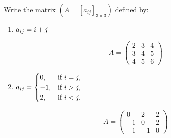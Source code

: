 \item  Write the matrix $\left(A=\left[a_{ij}\right]_{3\times3}\right)$ defined by:
    \begin {enumerate}
        \item $\mathlarger{a}_{ij} = i + j$
        \begin{answer}
            $$
            A = \begin{pmatrix}
            2 & 3 & 4 \\
            3 & 4 & 5 \\
            4 & 5 & 6
            \end{pmatrix}
            $$
        \end{answer}
        \item $\mathlarger{a}_{ij} = \begin{cases}
                0, & \text{if } i = j,\\
                -1, & \text{if } i > j,\\
                2, & \text{if } i < j.
                \end{cases}$
        \begin{answer}
            $$
            A = \begin{pmatrix}
            0 & 2 & 2 \\
            -1 & 0 & 2 \\
            -1 & -1 & 0
            \end{pmatrix}
            $$
        \end{answer}
    \end{enumerate}

